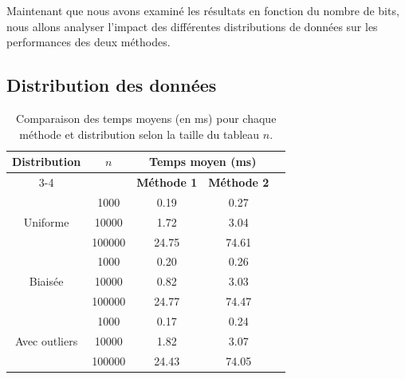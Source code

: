 \documentclass{rapportClass} %
\begin{document}
Maintenant que nous avons examiné les résultats en fonction du nombre de bits, nous allons analyser l'impact des différentes distributions de données sur les performances des deux méthodes.
\subsection{Distribution des données}

\begin{table}[H]
    \centering
    \caption{Comparaison des temps moyens (en ms) pour chaque méthode et distribution selon la taille du tableau $n$.}
    \label{tab:benchmark_results}
    \begin{tabular}{|c|c|c|c|c|}
        \hline
        \multirow{2}{*}{\textbf{Distribution}} & \multirow{2}{*}{$n$} & \multicolumn{2}{c|}{\textbf{Temps moyen (ms)}} \\
        \cline{3-4}
         & & \textbf{Méthode 1} & \textbf{Méthode 2} \\
        \hline
        \multirow{3}{*}{Uniforme} 
            & 1000  & 0.19 & 0.27 \\ \cline{2-4}
            & 10000 & 1.72 & 3.04  \\ \cline{2-4}
            & 100000 & 24.75 & 74.61 \\ 
        \hline
        \multirow{3}{*}{Biaisée} 
            & 1000  & 0.20 & 0.26 \\ \cline{2-4}
            & 10000 & 0.82 & 3.03 \\ \cline{2-4}
            & 100000 & 24.77 & 74.47 \\ 
        \hline
        \multirow{3}{*}{Avec outliers} 
            & 1000  & 0.17 & 0.24 \\ \cline{2-4}
            & 10000 & 1.82  & 3.07  \\ \cline{2-4}
            & 100000 & 24.43 & 74.05 \\ 
        \hline
    \end{tabular}
\end{table}

\end{document}
